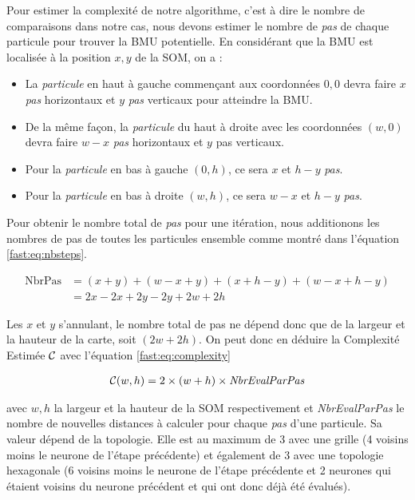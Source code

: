 	Pour estimer la complexité de notre algorithme, c'est à dire le nombre de comparaisons dans notre cas, nous devons estimer le nombre de \textit{pas} de chaque particule pour trouver la BMU potentielle. En considérant que la BMU est localisée à la position $x, y$ de la SOM, on a :
	\begin{itemize}
    	\item La \textit{particule} en haut à gauche commençant aux coordonnées $0, 0$ devra faire $x$ \textit{pas} horizontaux et $y$ \textit{pas} verticaux pour atteindre la BMU.
		\item De la même façon, la \textit{particule} du haut à droite avec les coordonnées $(w,0)$ devra faire $w-x$ \textit{pas} horizontaux et $y$ pas verticaux.
		\item Pour la \textit{particule} en bas à gauche $(0,h)$, ce sera $x$ et $h-y$ \textit{pas}.
		\item Pour la \textit{particule} en bas à droite $(w,h)$, ce sera $w-x$ et $h-y$ \textit{pas}.
	\end{itemize}

	Pour obtenir le nombre total de \textit{pas} pour une itération, nous additionons les nombres de pas de toutes les particules ensemble comme montré dans l'équation \ref{fast:eq:nbsteps}.

	\begin{equation}\label{fast:eq:nbsteps}
	\begin{split}
    	\text{NbrPas} &= (x + y) + (w - x + y) + (x + h - y) + (w - x + h - y)\\
		&= 2x - 2x + 2y - 2y + 2w + 2h 
	\end{split}
	\end{equation}

	Les $x$ et $y$ s'annulant, le nombre total de pas ne dépend donc que de la largeur et la hauteur de la carte, soit $(2w + 2h)$. On peut donc en déduire la Complexité Estimée $\cal C$ avec l'équation \ref{fast:eq:complexity}

	\begin{align}\label{fast:eq:complexity}
    	{\cal C}(w, h) = 2 \times (w + h) \times \textit{NbrEvalParPas}
	\end{align}

	avec $w, h$ la largeur et la hauteur de la SOM respectivement et \textit{NbrEvalParPas} le nombre de nouvelles distances à calculer pour chaque \textit{pas} d'une particule. Sa valeur dépend de la topologie. Elle est au maximum de 3 avec une grille (4 voisins moins le neurone de l'étape précédente) et également de 3 avec une topologie hexagonale (6 voisins moins le neurone de l'étape précédente et 2 neurones qui étaient voisins du neurone précédent et qui ont donc déjà été évalués). 


